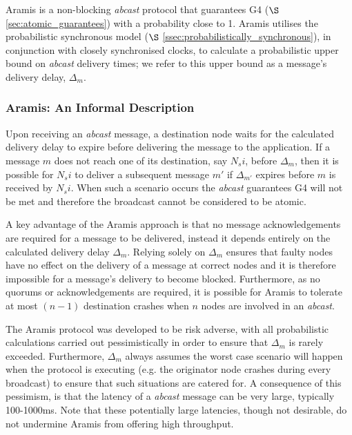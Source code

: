     \textsf{Aramis} is a non-blocking \emph{abcast} protocol that guarantees G4 ($\S$ \ref{sec:atomic_guarantees}) with a probability close to 1.  \textsf{Aramis} utilises the probabilistic synchronous model ($\S$ \ref{ssec:probabilistically_synchronous}), in conjunction with closely synchronised clocks, to calculate a probabilistic upper bound on \emph{abcast} delivery times; we refer to this upper bound as a message's delivery delay, $\Delta_m$.  
    
    \subsubsection*{\textsf{Aramis: } An Informal Description}
    Upon receiving an \emph{abcast} message, a destination node waits for the calculated delivery delay to expire before delivering the message to the application.  If a message $m$ does not reach one of its destination, say $N_si$, before $\Delta_m$, then it is possible for $N_si$ to deliver a subsequent message $m'$ if $\Delta_{m'}$ expires before $m$ is received by $N_si$.  When such a scenario occurs the \emph{abcast} guarantees G4 will not be met and therefore the broadcast cannot be considered to be atomic.  
    
    A key advantage of the \textsf{Aramis} approach is that no message acknowledgements are required for a message to be delivered, instead it depends entirely on the calculated delivery delay $\Delta_m$.  Relying solely on $\Delta_m$ ensures that faulty nodes have no effect on the delivery of a message at correct nodes and it is therefore impossible for a message's delivery to become blocked.  Furthermore, as no quorums or acknowledgements are required, it is possible for  \textsf{Aramis} to tolerate at most $(n - 1)$ destination crashes when $n$ nodes are involved in an \emph{abcast}.  
    
    The \textsf{Aramis} protocol was developed to be risk adverse, with all probabilistic calculations carried out pessimistically in order to ensure that $\Delta_m$ is rarely exceeded.  Furthermore, $\Delta_m$ always assumes the worst case scenario will happen when the protocol is executing (e.g. the originator node crashes during every broadcast) to ensure that such situations are catered for.  A consequence of this pessimism, is that the latency of a \emph{abcast} message can be very large, typically 100-1000ms.  Note that these potentially large latencies, though not desirable, do not undermine \textsf{Aramis} from offering high throughput.  
    
